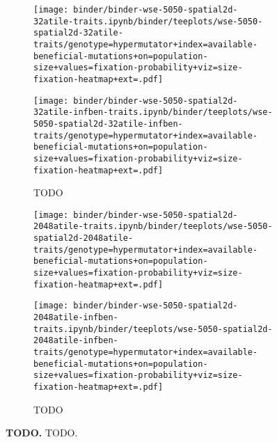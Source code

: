 \begin{figure}[h]
    \begin{subfigure}[b]{\linewidth}
        \begin{minipage}{0.5\linewidth}
          \texttt{[image: binder/binder-wse-5050-spatial2d-32atile-traits.ipynb/binder/teeplots/wse-5050-spatial2d-32atile-traits/genotype=hypermutator+index=available-beneficial-mutations+on=population-size+values=fixation-probability+viz=size-fixation-heatmap+ext=.pdf]}%
        \end{minipage}
        \begin{minipage}{0.5\linewidth}
          \texttt{[image: binder/binder-wse-5050-spatial2d-32atile-infben-traits.ipynb/binder/teeplots/wse-5050-spatial2d-32atile-infben-traits/genotype=hypermutator+index=available-beneficial-mutations+on=population-size+values=fixation-probability+viz=size-fixation-heatmap+ext=.pdf]}%
        \end{minipage}

        \caption{TODO}
        \label{fig:fixheat-altatile:32}

    \end{subfigure}

\begin{subfigure}[b]{\linewidth}
    \begin{minipage}{0.5\linewidth}
          \texttt{[image: binder/binder-wse-5050-spatial2d-2048atile-traits.ipynb/binder/teeplots/wse-5050-spatial2d-2048atile-traits/genotype=hypermutator+index=available-beneficial-mutations+on=population-size+values=fixation-probability+viz=size-fixation-heatmap+ext=.pdf]}%
    \end{minipage}%
    \begin{minipage}{0.5\linewidth}
          \texttt{[image: binder/binder-wse-5050-spatial2d-2048atile-infben-traits.ipynb/binder/teeplots/wse-5050-spatial2d-2048atile-infben-traits/genotype=hypermutator+index=available-beneficial-mutations+on=population-size+values=fixation-probability+viz=size-fixation-heatmap+ext=.pdf]}%
    \end{minipage}

\caption{TODO}
\label{fig:fixheat-altatile:2048}
\end{subfigure}

  \begin{minipage}{\linewidth}
    \caption{%
      \textbf{TODO.}
      \footnotesize
     TODO.
    }
    \label{fig:fixheat-wse}
  \end{minipage}
\end{figure}
